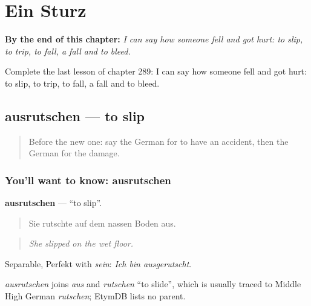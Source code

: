 
\chapter{Ein Sturz}
\label{ch:ge-ein-sturz}

\begin{chapteropening}
\textbf{By the end of this chapter:} \emph{I can say how someone fell and got hurt: to slip, to trip, to fall, a fall and to bleed.}

Complete the last lesson of chapter 289: I can say how someone fell and got hurt: to slip, to trip, to fall, a fall and to bleed.
\end{chapteropening}

\section[ausrutschen]{ausrutschen — to slip}

\label{lesson:GE-C289-ausrutschen}



\begin{quote}
Before the new one: say the German for to have an accident, then the German for the damage.
\end{quote}

\subsection*{You'll want to know: ausrutschen}
\textbf{ausrutschen} — \textquotedblleft{}to slip\textquotedblright{}.

\begin{quote}
Sie rutschte auf dem nassen Boden aus.
\end{quote}

\begin{quote}
\emph{She slipped on the wet floor.}
\end{quote}

Separable, Perfekt with \emph{sein}: \emph{Ich bin ausgerutscht}.

\begin{cousinweb}
\emph{ausrutschen} joins \emph{aus} and \emph{rutschen} \textquotedblleft{}to slide\textquotedblright{}, which is usually traced to Middle High German \emph{rutschen}; EtymDB lists no parent.
\end{cousinweb}

